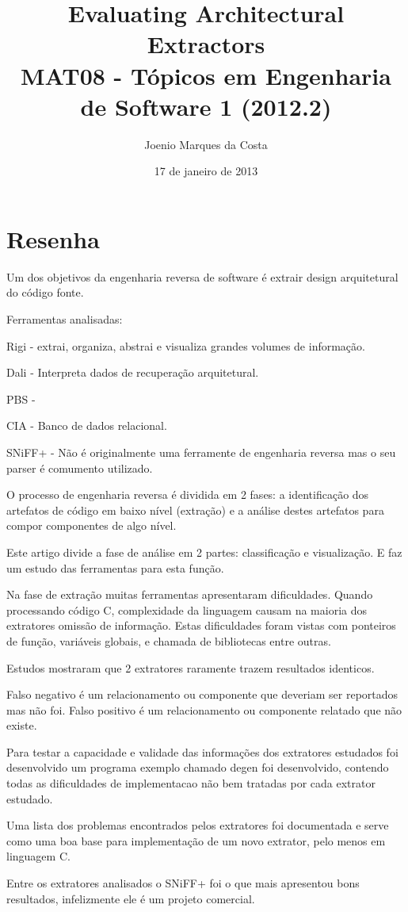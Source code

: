 \documentclass[12pt]{article}
\title{Evaluating Architectural Extractors
 \cite{EvaluatingArchitectural} \\
 \large MAT08 - Tópicos em Engenharia de Software 1 (2012.2)}
\author{Joenio Marques da Costa}
\date{17 de janeiro de 2013}
\begin{document}
\maketitle

\section*{Resenha}

Um dos objetivos da engenharia reversa de software é extrair design arquitetural
do código fonte.

Ferramentas analisadas:

Rigi - extrai, organiza, abstrai e visualiza grandes volumes de informação.

Dali - Interpreta dados de recuperação arquitetural.

PBS - 

CIA - Banco de dados relacional.

SNiFF+ - Não é originalmente uma ferramente de engenharia reversa mas o seu parser
é comumento utilizado.

O processo de engenharia reversa é dividida em 2 fases: a identificação dos artefatos
de código em baixo nível (extração) e a análise destes artefatos para compor componentes
de algo nível.

Este artigo divide a fase de análise em 2 partes: classificação e visualização. E faz
um estudo das ferramentas para esta função.

Na fase de extração muitas ferramentas apresentaram dificuldades. Quando processando
código C, complexidade da linguagem causam na maioria dos extratores omissão de
informação. Estas dificuldades foram vistas com ponteiros de função, variáveis globais,
e chamada de bibliotecas entre outras.

Estudos mostraram que 2 extratores raramente trazem resultados identicos.

Falso negativo é um relacionamento ou componente que deveriam ser reportados mas não
foi. Falso positivo é um relacionamento ou componente relatado que não existe.

Para testar a capacidade e validade das informações dos extratores estudados foi
desenvolvido um programa exemplo chamado degen foi desenvolvido, contendo
todas as dificuldades de implementacao não bem tratadas por cada extrator estudado.

Uma lista dos problemas encontrados pelos extratores foi documentada e serve
como uma boa base para implementação de um novo extrator, pelo menos em linguagem C.

Entre os extratores analisados o SNiFF+ foi o que mais apresentou bons resultados,
infelizmente ele é um projeto comercial.


\end{document}
